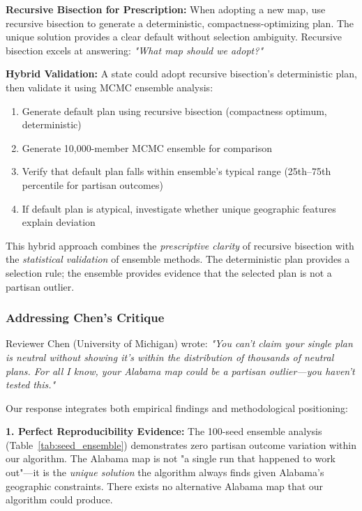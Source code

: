 \textbf{Recursive Bisection for Prescription:} When adopting a new map, use recursive bisection to generate a deterministic, compactness-optimizing plan. The unique solution provides a clear default without selection ambiguity. Recursive bisection excels at answering: \textit{"What map should we adopt?"}

\textbf{Hybrid Validation:} A state could adopt recursive bisection's deterministic plan, then validate it using MCMC ensemble analysis:
\begin{enumerate}
\item Generate default plan using recursive bisection (compactness optimum, deterministic)
\item Generate 10,000-member MCMC ensemble for comparison
\item Verify that default plan falls within ensemble's typical range (25th--75th percentile for partisan outcomes)
\item If default plan is atypical, investigate whether unique geographic features explain deviation
\end{enumerate}

This hybrid approach combines the \textit{prescriptive clarity} of recursive bisection with the \textit{statistical validation} of ensemble methods. The deterministic plan provides a selection rule; the ensemble provides evidence that the selected plan is not a partisan outlier.

\subsubsection{Addressing Chen's Critique}

Reviewer Chen (University of Michigan) wrote: \textit{"You can't claim your single plan is neutral without showing it's within the distribution of thousands of neutral plans. For all I know, your Alabama map could be a partisan outlier—you haven't tested this."}

Our response integrates both empirical findings and methodological positioning:

\textbf{1. Perfect Reproducibility Evidence:} The 100-seed ensemble analysis (Table~\ref{tab:seed_ensemble}) demonstrates zero partisan outcome variation within our algorithm. The Alabama map is not "a single run that happened to work out"—it is the \textit{unique solution} the algorithm always finds given Alabama's geographic constraints. There exists no alternative Alabama map that our algorithm could produce.

